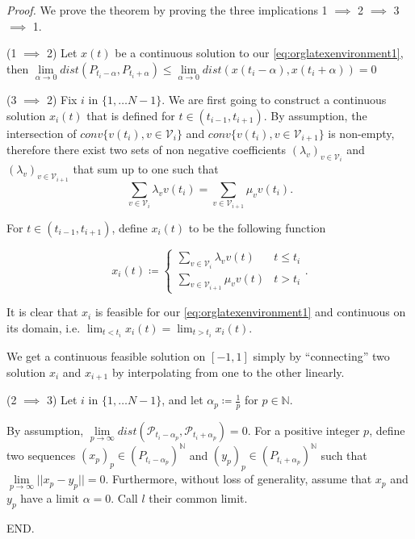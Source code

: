 \documentclass[moor]{informs1}
\renewenvironment{proof}{\emph{Proof.}}{END.}
\begin{document}
\begin{proof}
We prove the theorem by proving the three implications   1 \(\implies\) 2 \(\implies\) 3 \(\implies\) 1.

(1 \(\implies\) 2)
Let \(x(t)\) be a continuous solution to our \ref{eq:orglatexenvironment1}, then \(\underset{\alpha \rightarrow 0}{\lim} dist(P_{t_i-\alpha}, P_{t_i+\alpha}) \le \underset{\alpha \rightarrow 0}{\lim} dist(x(t_i-\alpha), x(t_i+\alpha))= 0\)

(3 \(\implies\) 2)
Fix \(i\) in \(\{1, \ldots N-1\}\).
We are first going to construct a continuous solution \(x_i(t)\) that is defined for \(t \in (t_{i-1}, t_{i+1})\).
By assumption, the intersection of \(conv \{ v(t_{i}), v \in \mathcal V_i\}\) and \(conv \{ v(t_{i}), v \in \mathcal V_{i+1}\}\) is non-empty, therefore there exist two sets of non negative coefficients \((\lambda_v)_{v \in \mathcal V_i}\) and \((\lambda_v)_{v \in \mathcal V_{i+1}}\) that sum up to one such that
$$\sum_{v \in \mathcal V_i}  \lambda_{v} v(t_i) = \sum_{v \in \mathcal V_{i+1}}  \mu_{v} v(t_i).$$

For \(t \in (t_{i-1}, t_{i+1})\), define \(x_i(t)\) to be the following function

\[x_i(t) \coloneqq \left\{\begin{array}{cc}
   \sum_{v \in \mathcal V_i} \lambda_v v(t) & t \le t_i\\
   \sum_{v \in \mathcal V_{i+1}} \mu_v v(t) & t > t_i
   \end{array}\right. .
   \]

It is clear that \(x_i\) is feasible for our \ref{eq:orglatexenvironment1} and continuous on its domain, i.e. \(\lim_{t < t_i} x_i(t) = \lim_{t > t_i} x_i(t)\).


We get a continuous feasible solution on \([-1, 1]\) simply by ``connecting'' two solution \(x_i\) and \(x_{i+1}\) by interpolating from one to the other linearly.

(2 \(\implies\) 3)
Let \(i\) in \(\{1, \ldots N-1\}\), and let \(\alpha_p \coloneqq \frac1p\) for \(p \in \mathbb N\).

By assumption, \(\underset{p \rightarrow \infty}{\lim} dist(\mathcal P_{t_i-\alpha_p}, \mathcal P_{t_i+\alpha_p}) = 0\). For a positive integer \(p\), define two sequences  \((x_p)_p \in (P_{t_i-\alpha_p})^{\mathbb N}\) and \((y_p)_p \in (P_{t_i+\alpha_p})^{\mathbb N}\) such that \(\underset{p \rightarrow \infty}{\lim}{||x_p - y_p||} = 0\). Furthermore, without loss of generality, assume that \(x_p\) and \(y_p\) have a limit \(\alpha=0\). Call \(l\) their common limit.


\end{proof}
\end{document}
